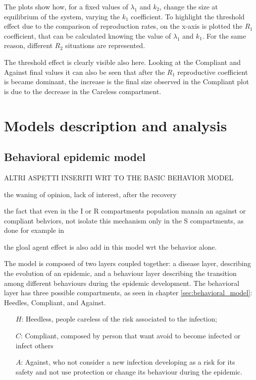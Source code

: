 The plots show how, for a fixed values of $\lambda_1$ and $k_2$, change the size at equilibrium of the system, varying the $k_1$ coefficient. To highlight the threshold effect due to the comparison of reproduction rates, on the x-axis is plotted the $R_1$  coefficient, that can be calculated knowing the value of  $\lambda_1$ and $k_1$. For the same reason, different $R_2$ situations are represented. 

The threshold effect is clearly visible also here. Looking at the Compliant and Against final values it can also be seen that after the $R_1$ reproductive coefficient is became dominant, the  increase is the final size observed in the Compliant plot is due to the decrease in the Careless compartment. 





\chapter{Models description and analysis}
\label{ch:epi_behav_model}
\section{Behavioral epidemic model}

ALTRI ASPETTI INSERITI WRT TO THE BASIC BEHAVIOR MODEL

the waning of opinion, lack of interest, after the recovery \cite{Zuo2022,Kemp_2021} 

the fact that even in the I or R compartments population manain an against or compliant behviors, not isolate this mechanism only in the S compartments, as done for example in \cite{Zuo2022} 

the gloal agent effect is also add in this model wrt the behavior alone.

The model is composed of two layers coupled together: a disease layer, describing the evolution of an epidemic, and a behaviour layer describing the transition among different behaviours during the epidemic development.
The behavioral layer has three possible compartments, as seen in chapter \ref{sec:behavioral_model}: Heedles, Compliant, and Against.

\begin{itemize}
	\item[$H$:] Heedless, people careless of the risk associated to the infection;
	\item[$C$:] Compliant, composed by person that want avoid to become infected or infect others
	\item[$A$:] Against, who not consider a new infection developing as a risk for its safety and not use protection or change its behaviour during the epidemic. 
\end{itemize}

